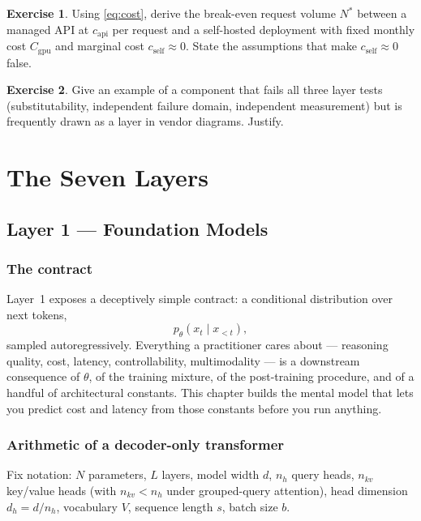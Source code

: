 \documentclass[11pt,twoside,openright]{book}
\theoremstyle{definition}
\newtheorem{exercise}{Exercise}[chapter]
\theoremstyle{plain}
\theoremstyle{remark}
\begin{document}
\begin{exercise}
Using \eqref{eq:cost}, derive the break-even request volume $N^{*}$ between a
managed API at $c_{\text{api}}$ per request and a self-hosted deployment with
fixed monthly cost $C_{\text{gpu}}$ and marginal cost $c_{\text{self}} \approx 0$.
State the assumptions that make $c_{\text{self}} \approx 0$ false.
\end{exercise}

\begin{exercise}
Give an example of a component that fails all three layer tests
(substitutability, independent failure domain, independent measurement) but is
frequently drawn as a layer in vendor diagrams. Justify.
\end{exercise}

\cleardoublepage

\part{The Seven Layers}
\label{part:layers}

\chapter{Layer 1 --- Foundation Models}
\label{ch:models}

\section{The contract}

Layer~1 exposes a deceptively simple contract: a conditional distribution over
next tokens,
\[
  p_\theta\!\left(x_t \mid x_{<t}\right),
\]
sampled autoregressively. Everything a practitioner cares about --- reasoning
quality, cost, latency, controllability, multimodality --- is a downstream
consequence of $\theta$, of the training mixture, of the post-training
procedure, and of a handful of architectural constants. This chapter builds the
mental model that lets you predict cost and latency from those constants before
you run anything.

\section{Arithmetic of a decoder-only transformer}

Fix notation: $N$ parameters, $L$ layers, model width $d$, $n_h$ query heads,
$n_{kv}$ key/value heads (with $n_{kv} < n_h$ under grouped-query attention),
head dimension $d_h = d/n_h$, vocabulary $V$, sequence length $s$, batch size
$b$.
\end{document}
